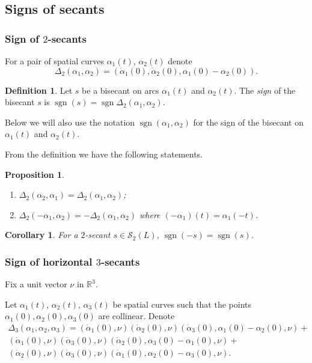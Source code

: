 \documentclass{article}
\newtheorem{corollary}{Corollary}
\newtheorem{proposition}{Proposition}
\theoremstyle{definition}
\newtheorem{definition}{Definition}
\theoremstyle{remark}
\def\R{{\mathbb R}}
\DeclareMathOperator{\sgn}{\mathrm{sgn}}
\begin{document}
\subsection{Signs of secants}\label{subsect:secant_sign}

\subsubsection{Sign of $2$-secants}
For a pair of spatial curves $\alpha_1(t)$, $\alpha_2(t)$ denote
\begin{equation}\label{eq:delta2}
 \Delta_2(\alpha_1,\alpha_2)=(\dot\alpha_1(0),\dot\alpha_2(0),\alpha_1(0)-\alpha_2(0)).
\end{equation}

\begin{definition}\label{def:2secant_sign}
Let $s$ be a bisecant on arcs $\alpha_1(t)$ and $\alpha_2(t)$. The \emph{sign} of the bisecant $s$ is $\sgn(s)=\sgn\Delta_2(\alpha_1,\alpha_2)$.
\end{definition}

Below we will also use the notation $\sgn(\alpha_1,\alpha_2)$ for the sign of the bisecant on $\alpha_1(t)$ and $\alpha_2(t)$.

From the definition we have the following statements.
\begin{proposition}\label{prop:2secant_delta}
\begin{enumerate}
    \item $\Delta_2(\alpha_2,\alpha_1)=\Delta_2(\alpha_1,\alpha_2)$;
    \item $\Delta_2(-\alpha_1,\alpha_2)=-\Delta_2(\alpha_1,\alpha_2)$ where $(-\alpha_1)(t)=\alpha_1(-t)$.
\end{enumerate}
\end{proposition}
\begin{corollary}\label{cor:2secant_inverse_sign}
    For a $2$-secant $s\in\mathcal S_2(L)$, $\sgn(-s)=\sgn(s)$.
\end{corollary}

\subsubsection{Sign of horizontal $3$-secants}

Fix a unit vector $\nu$ in $\R^3$.

Let $\alpha_1(t)$, $\alpha_2(t)$, $\alpha_3(t)$ be spatial curves such that the points $\alpha_1(0), \alpha_2(0), \alpha_3(0)$ are collinear. Denote
\begin{multline}\label{eq:delta3}
\Delta_3(\alpha_1,\alpha_2,\alpha_3)= (\dot\alpha_1(0),\nu)(\dot\alpha_2(0),\nu)(\dot\alpha_3(0),\alpha_1(0)-\alpha_2(0),\nu)+\\
    (\dot\alpha_1(0),\nu)(\dot\alpha_3(0),\nu)(\dot\alpha_2(0),\alpha_3(0)-\alpha_1(0),\nu)+\\
    (\dot\alpha_2(0),\nu)(\dot\alpha_3(0),\nu)(\dot\alpha_1(0),\alpha_2(0)-\alpha_3(0),\nu).
\end{multline}
\end{document}
